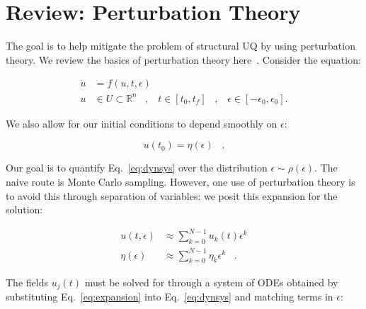 \documentclass[11pt]{article}
\begin{document}
\newcommand*{\vertbar}{\rule[-1ex]{0.5pt}{2.5ex}}
\newcommand*{\horzbar}{\rule[.5ex]{2.5ex}{0.5pt}}
\maketitle

\vspace*{-0.75in}

\section{Review: Perturbation Theory}

The goal is to help mitigate the problem of structural UQ by using perturbation theory. 
We review the basics of perturbation theory here~\cite{khalil}.
Consider the equation:

\begin{equation}
        \label{eq:dynsys}
        \begin{aligned}
                \dot{u} &= f( u , t , \epsilon )  \\
                u &\in U \subset \mathbb{R}^n \;\;\; , \;\;\; t \in [t_0,t_f] \;\;\; , \;\;\; \epsilon \in [-\epsilon_0 , \epsilon_0].
        \end{aligned}
\end{equation}

\noindent We also allow for our initial conditions to depend smoothly on $\epsilon$:

\begin{equation}
        \label{eq:ics}
        u(t_0) = \eta(\epsilon) \;\;\; .
\end{equation}

\noindent Our goal is to quantify Eq.~\ref{eq:dynsys} over the distribution $\epsilon \sim \rho(\epsilon)$. 
The naive route is Monte Carlo sampling. 
However, one use of perturbation theory is to avoid this through separation of variables: we posit this expansion for the solution:

\begin{equation}
        \label{eq:expansion}
        \begin{aligned}
                u( t , \epsilon ) &\approx \sum_{k=0}^{N-1} u_k(t) \epsilon^k \\
                \eta( \epsilon ) &\approx \sum_{k=0}^{N-1} \eta_k \epsilon^k \;\;\; .
        \end{aligned}
\end{equation}

\noindent The fields $u_j(t)$ must be solved for through a system of ODEs obtained by substituting Eq.~\ref{eq:expansion} into Eq.~\ref{eq:dynsys} and matching terms in $\epsilon$:
\end{document}
